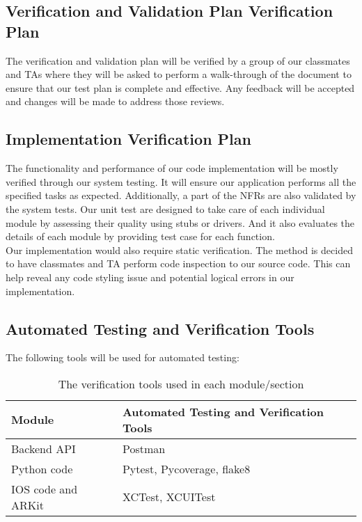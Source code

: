 \documentclass[12pt, titlepage]{article}
\begin{document}
\subsection{Verification and Validation Plan Verification Plan}



\noindent
The verification and validation plan will be verified by a group of our classmates and TAs where they will be asked to perform a walk-through of the document to ensure that our test plan is complete and effective. Any feedback will be accepted and changes will be made to address those reviews.

\subsection{Implementation Verification Plan}

  
The functionality and performance of our code implementation will be mostly verified through our system testing. It will ensure our application performs all the specified tasks as expected. Additionally, a part of the NFRs are also validated by the system tests. Our unit test are designed to take care of each individual module by assessing their quality using stubs or drivers. And it also evaluates the details of each module by providing test case for each function.\\
\noindent
Our implementation would also require static verification. The method is decided to have classmates and TA perform code inspection to our source code. This can help reveal any code styling issue and potential logical errors in our implementation.

\subsection{Automated Testing and Verification Tools}

The following tools will be used for automated testing:

\begin{table}[!h]
    \centering
    \begin{tabular}{l|l}
    \hline
        \textbf{Module} & \textbf{Automated Testing and Verification Tools} \\ \hline
        Backend API & Postman \\ \hline
        Python code & Pytest, Pycoverage, flake8 \\ \hline
        IOS code and ARKit & XCTest, XCUITest \\ \hline
    \end{tabular}
    \caption{The verification tools used in each module/section}
\end{table}
\end{document}
